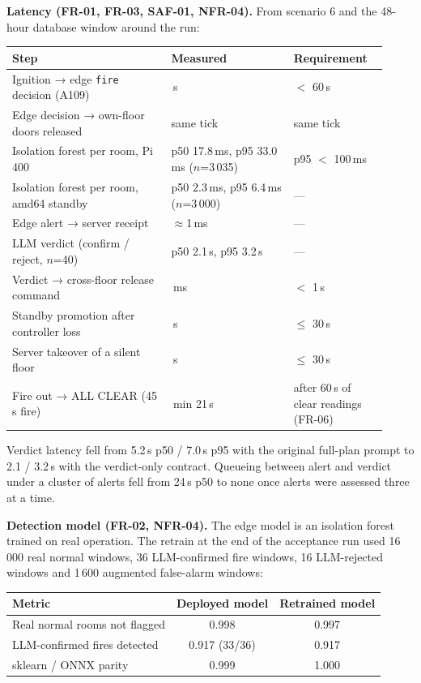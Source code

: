 \documentclass[11pt]{article}
\begin{document}
\textbf{Latency (FR-01, FR-03, SAF-01, NFR-04).} From scenario 6 and the 48-hour database window 
around the run:

\begin{center}
\begin{tabular}{@{}>{\raggedright\arraybackslash}p{0.39\linewidth}>{\raggedright\arraybackslash}p{0.30\linewidth}>{\raggedright\arraybackslash}p{0.23\linewidth}@{}}
\toprule
\textbf{Step} & \textbf{Measured} & \textbf{Requirement} \\
\midrule
Ignition → edge \texttt{fire} decision (A109) & 14.7\,s & $<$ 60\,s \\
Edge decision → own-floor doors released & same tick & same tick \\
Isolation forest per room, Pi 400 & p50 17.8\,ms, p95 33.0\,ms ($n$=3\,035) & p95 $<$ 100\,ms \\
Isolation forest per room, amd64 standby & p50 2.3\,ms, p95 6.4\,ms ($n$=3\,000) & --- \\
Edge alert → server receipt & $\approx$1\,ms & --- \\
LLM verdict (confirm / reject, $n$=40) & p50 2.1\,s, p95 3.2\,s & --- \\
Verdict → cross-floor release command & 25\,ms & $<$ 1\,s \\
Standby promotion after controller loss & 30\,s & $\leq$ 30\,s \\
Server takeover of a silent floor & 30\,s & $\leq$ 30\,s \\
Fire out → ALL CLEAR (45\,s fire) & 7\,min 21\,s & after 60\,s of clear readings (FR-06) \\
\bottomrule
\end{tabular}
\end{center}

Verdict latency fell from 5.2\,s p50 / 7.0\,s p95 with the original full-plan prompt to 
2.1 / 3.2\,s with the verdict-only contract. Queueing between alert and verdict under a cluster 
of alerts fell from 24\,s p50 to none once alerts were assessed three at a time.

\textbf{Detection model (FR-02, NFR-04).} The edge model is an isolation forest trained on real 
operation. The retrain at the end of the acceptance run used 16\,000 real normal windows, 36 
LLM-confirmed fire windows, 16 LLM-rejected windows and 1\,600 augmented false-alarm windows:

\begin{center}
\begin{tabular}{lcc}
\toprule
\textbf{Metric} & \textbf{Deployed model} & \textbf{Retrained model} \\
\midrule
Real normal rooms not flagged & 0.998 & 0.997 \\
LLM-confirmed fires detected & 0.917 (33/36) & 0.917 \\
sklearn / ONNX parity & 0.999 & 1.000 \\
\bottomrule
\end{tabular}
\end{center}
\end{document}

